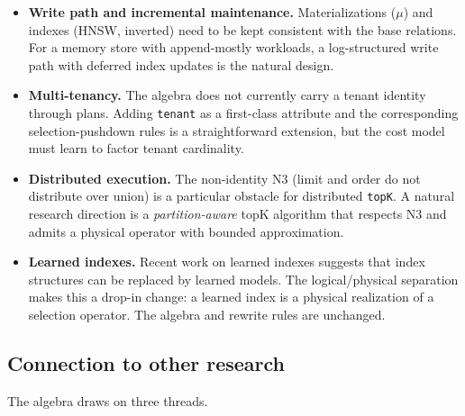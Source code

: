 \documentclass[sigconf,nonacm,review]{acmart}
\theoremstyle{plain}
\theoremstyle{definition}
\theoremstyle{remark}
\begin{document}
\begin{itemize}[leftmargin=*]
  \item \textbf{Write path and incremental maintenance.}
    Materializations ($\mu$) and indexes (HNSW, inverted) need to be
    kept consistent with the base relations. For a memory store with
    append-mostly workloads, a log-structured write path with
    deferred index updates is the natural design.
  \item \textbf{Multi-tenancy.} The algebra does not currently carry
    a tenant identity through plans. Adding \texttt{tenant} as a
    first-class attribute and the corresponding
    selection-pushdown rules is a straightforward extension, but the
    cost model must learn to factor tenant cardinality.
  \item \textbf{Distributed execution.} The non-identity N3 (limit
    and order do not distribute over union) is a particular obstacle
    for distributed \texttt{topK}. A natural research direction is a
    \emph{partition-aware} topK algorithm that respects N3 and admits
    a physical operator with bounded approximation.
  \item \textbf{Learned indexes.} Recent work on learned indexes
    \cite{kraska2018} suggests that index structures can be replaced
    by learned models. The logical/physical separation makes this a
    drop-in change: a learned index is a physical realization of a
    selection operator. The algebra and rewrite rules are unchanged.
\end{itemize}

\subsection{Connection to other research}\label{sec:discuss:connection}

The algebra draws on three threads.
\end{document}
